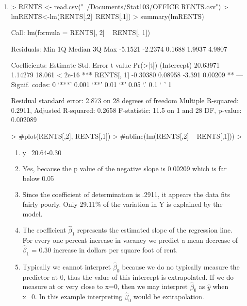 \documentclass{article}
\begin{document}


\begin{enumerate}

\item

\begin{Schunk}
\begin{Sinput}
> RENTS <- read.csv("~/Documents/Stat103/OFFICE RENTS.csv")
> lmRENTS<-lm(RENTS[,2]~RENTS[,1])
> summary(lmRENTS)
\end{Sinput}
\begin{Soutput}
Call:
lm(formula = RENTS[, 2] ~ RENTS[, 1])

Residuals:
    Min      1Q  Median      3Q     Max 
-5.1521 -2.2374  0.1688  1.9937  4.9807 

Coefficients:
            Estimate Std. Error t value Pr(>|t|)    
(Intercept) 20.63971    1.14279  18.061  < 2e-16 ***
RENTS[, 1]  -0.30380    0.08958  -3.391  0.00209 ** 
---
Signif. codes:  0 ‘***’ 0.001 ‘**’ 0.01 ‘*’ 0.05 ‘.’ 0.1 ‘ ’ 1

Residual standard error: 2.873 on 28 degrees of freedom
Multiple R-squared:  0.2911,	Adjusted R-squared:  0.2658 
F-statistic:  11.5 on 1 and 28 DF,  p-value: 0.002089
\end{Soutput}
\begin{Sinput}
> #plot(RENTS[,2], RENTS[,1])
> #abline(lm(RENTS[,2] ~ RENTS[,1]))
> 
\end{Sinput}
\end{Schunk}


\begin{enumerate}[a]
\item y=20.64-0.30

\item Yes, because the p value of the negative slope is 0.00209 which is far below 0.05

\item Since the coefficient of determination is .2911, it appears the data fits fairly poorly. Only 29.11\% of the variation in Y is explained by the model.

\item The coefficient $\hat{\beta} _1$ represents the estimated slope of the regression line. For every one percent increase in vacancy we predict a mean decrease of $\hat{\beta} _1$ = 0.30 increase in dollars per square foot of rent. 

\item 
Typically we cannot interpret $\hat{\beta} _0$ because we do no typically measure the predictor at 0, thus the value of this intercept is extrapolated. If we do measure at or very close to x=0, then we may interpret $\hat{\beta} _0$ as $\hat{y}$ when x=0. In this example interpreting $\hat{\beta} _0$ would be extrapolation.


\end{enumerate}
\end{enumerate}
\end{document}

